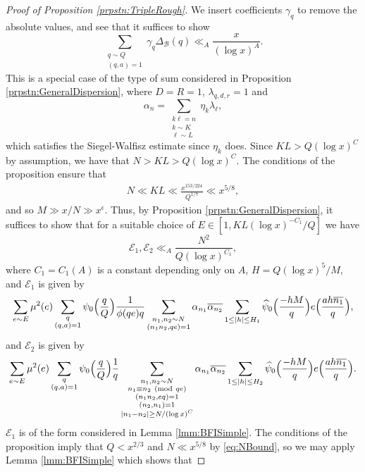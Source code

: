 \documentclass[10pt]{amsart}
\theoremstyle{plain}
\numberwithin{equation}{section}
\newcommand{\Mod}[1]{\ (\mathrm{mod}\ #1)}
\renewcommand{\hat}[1]{\widehat #1}
\begin{document}
\begin{proof}[Proof of Proposition \ref{prpstn:TripleRough}]
We insert coefficients $\gamma_q$ to remove the absolute values, and see that it suffices to show
\[
\sum_{\substack{q\sim Q\\ (q,a)=1}}\gamma_q\Delta_{\mathscr{B}}(q)\ll_{A} \frac{x}{(\log{x})^A}.
\]
This is a special case of the type of sum considered in Proposition \ref{prpstn:GeneralDispersion}, where $D=R=1$, $\lambda_{q,d,r}=1$ and
\[
\alpha_n=\sum_{\substack{k\ell=n\\ k\sim K\\ \ell\sim L}}\eta_k\lambda_\ell,
\]
which satisfies the Siegel-Walfisz estimate since $\eta_k$ does. Since $KL>Q(\log{x})^C$ by assumption, we have that $N>KL>Q(\log{x})^C$. The conditions of the proposition ensure that
\begin{align}
N\ll KL \ll  \frac{x^{153/224}}{Q^{1/7}} \ll x^{5/8},\label{eq:NBound}
\end{align}
and so $M\gg x/N \gg x^\epsilon$. Thus, by Proposition \ref{prpstn:GeneralDispersion}, it suffices to show that for a suitable choice of $E\in [1,KL(\log{x})^{-C_1}/Q]$ we have
\[
\mathscr{E}_1,\mathscr{E}_2\ll_{A} \frac{N^2}{Q (\log{x})^{C_1}},
\]
where $C_1=C_1(A)$ is a constant depending only on $A$, $H=Q(\log{x})^5/M$, and $\mathscr{E}_{1}$ is given by
\begin{align*}
\sum_{e\sim E}\mu^2(e)\sum_{\substack{q\\ (q,a)=1}}\psi_0\Bigl(\frac{q}{Q}\Bigr)\frac{1 }{\phi(q e)q}\sum_{\substack{n_1,n_2\sim N\\ (n_1n_2,q e)=1}}\alpha_{n_1}\overline{\alpha_{n_2}}\sum_{1\le |h|\le H_1}\hat{\psi}_0\Bigl(\frac{-h M}{q}\Bigr)e\Bigl( \frac{a h \overline{ n_1}}{q}\Bigr),
\end{align*}
and $\mathscr{E}_2$ is given by
\begin{align*}
\sum_{e\sim E}\mu^2(e)\sum_{\substack{q\\ (q,a)=1}}\psi_0\Bigl(\frac{q}{Q}\Bigr)\frac{1}{q}\sum_{\substack{n_1,n_2\sim N\\ n_1\equiv n_2\Mod{q e}\\ (n_1n_2,eq)=1\\(n_2,n_1)=1\\ |n_1-n_2|\ge N/(\log{x})^C}}\alpha_{n_1}\overline{\alpha_{n_2}}\sum_{1\le |h|\le H_2}\hat{\psi}_0\Bigl(\frac{-h M}{q}\Bigr)e\Bigl(\frac{ah\overline{n_1}}{q}\Bigr).
\end{align*}
$\mathscr{E}_1$ is of the form considered in Lemma \ref{lmm:BFISimple}. The conditions of the proposition imply that $Q<x^{2/3}$ and $N\ll x^{5/8}$ by \eqref{eq:NBound}, so we may apply Lemma \ref{lmm:BFISimple} which shows that

\end{proof}
\end{document}
